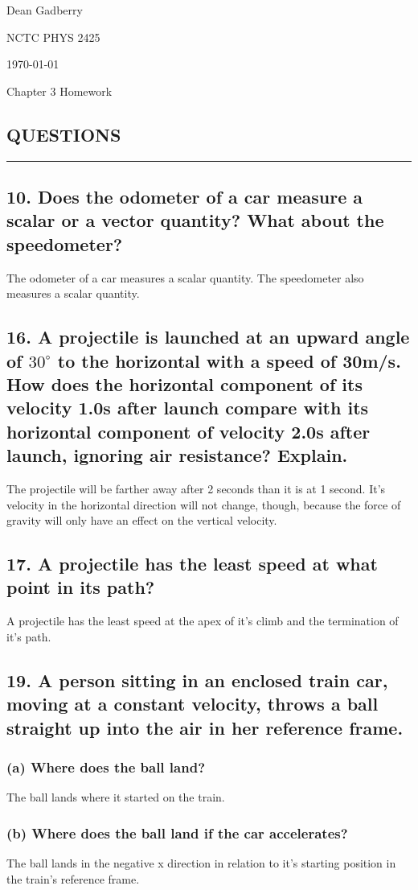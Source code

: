 \documentclass[12pt,a4paper,english]{article}
\newcommand{\degree}[1]{${#1}^\circ$}
\begin{document}
\begin{flushright}
  Dean Gadberry

  NCTC PHYS 2425

  \today
\end{flushright}
\begin{center}
  {\large Chapter 3 Homework}
\end{center}
\begin{flushleft}
  \section*{QUESTIONS}
  \hrule
  \subsection{10. Does the odometer of a car measure a scalar or a vector quantity? What about the speedometer?}
  The odometer of a car measures a scalar quantity. The speedometer also measures a scalar quantity.
  \subsection{16. A projectile is launched at an upward angle of \degree{30} to the horizontal with a speed of 30m/s. How does the horizontal component of its velocity 1.0s after launch compare with its horizontal component of velocity 2.0s after launch, ignoring air resistance? Explain.}
  The projectile will be farther away after 2 seconds than it is at 1 second. It's velocity in the horizontal direction will not change, though, because the force of gravity will only have an effect on the vertical velocity.
  \subsection{17. A projectile has the least speed at what point in its path?}
  A projectile has the least speed at the apex of it's climb and the termination of it's path.
  \subsection{19. A person sitting in an enclosed train car, moving at a constant velocity, throws a ball straight up into the air in her reference frame.}
  \subsubsection{(a) Where does the ball land?}
  The ball lands where it started on the train.
  \subsubsection{(b) Where does the ball land if the car accelerates?}
  The ball lands in the negative x direction in relation to it's starting position in the train's reference frame.

\end{flushleft}
\end{document}
